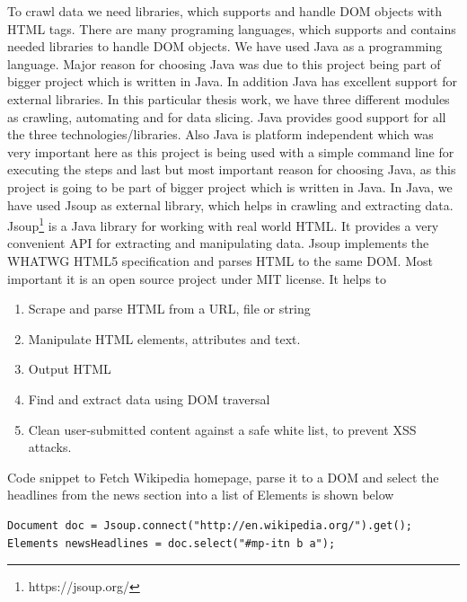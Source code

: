 \documentclass[article,type=msc,colorback,accentcolor=tud9c,twoside,11pt]{tudthesis}
\begin{document}
To crawl data we need libraries, which supports and handle DOM objects with HTML tags. There are many programing languages, which supports and contains needed libraries to handle DOM objects. We have used Java as a programming language. Major reason for choosing Java was due to this project being part of bigger project which is written in Java. In addition Java has excellent support for external libraries. In this particular thesis work, we have three different modules as crawling, automating and for data slicing. Java provides good support for all the three technologies/libraries. Also Java is platform independent which was very important here as this project is being used with a simple command line for executing the steps and last but most important reason for choosing Java, as this project is going to be part of bigger project which is written in Java. In Java, we have used Jsoup as external library, which helps in crawling and extracting data. Jsoup\footnote{https://jsoup.org/} is a Java library for working with real world HTML. It provides a very convenient API for extracting and manipulating data. Jsoup implements the WHATWG HTML5 specification and parses HTML to the same DOM. Most important it is an open source project under MIT license. It helps to
\begin{enumerate}
\item Scrape and parse HTML from a URL, file or string
\item Manipulate HTML elements, attributes and text.
\item Output HTML
\item Find and extract data using DOM traversal
\item Clean user-submitted content against a safe white list, to prevent XSS attacks.
\end{enumerate}
Code snippet to Fetch Wikipedia homepage, parse it to a DOM and select the headlines from the news section into a list of Elements is shown below

\begin{lstlisting}
Document doc = Jsoup.connect("http://en.wikipedia.org/").get();
Elements newsHeadlines = doc.select("#mp-itn b a");
\end{lstlisting}
\end{document}
